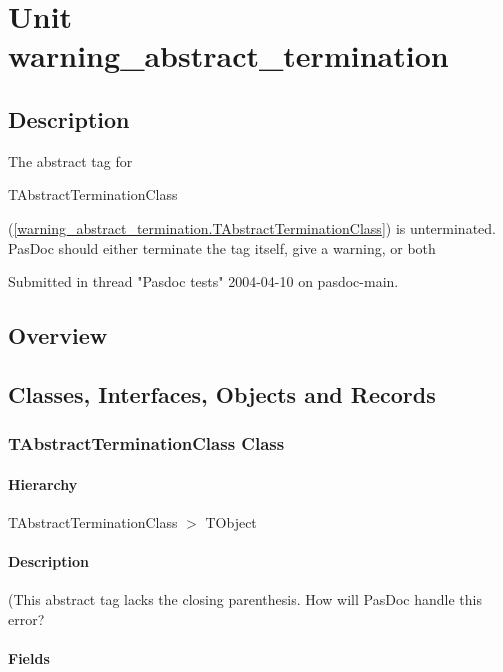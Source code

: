 \documentclass{report}
\begin{document}
\chapter{Unit warning{\_}abstract{\_}termination}
\section{Description}
The abstract tag for \begin{ttfamily}TAbstractTerminationClass\end{ttfamily}(\ref{warning_abstract_termination.TAbstractTerminationClass}) is unterminated. PasDoc should either terminate the tag itself, give a warning, or both\hfill\vspace*{1ex}



Submitted in thread "Pasdoc tests" 2004{-}04{-}10 on pasdoc{-}main.
\section{Overview}
\begin{description}
\item[\texttt{\begin{ttfamily}TAbstractTerminationClass\end{ttfamily} Class}]
\end{description}
\section{Classes, Interfaces, Objects and Records}
\subsection*{TAbstractTerminationClass Class}
\subsubsection*{\large{\textbf{Hierarchy}}\normalsize\hspace{1ex}\hfill}
TAbstractTerminationClass {$>$} TObject
\subsubsection*{\large{\textbf{Description}}\normalsize\hspace{1ex}\hfill}
(This abstract tag lacks the closing parenthesis. How will PasDoc handle this error?\subsubsection*{\large{\textbf{Fields}}\normalsize\hspace{1ex}\hfill}
\end{document}
